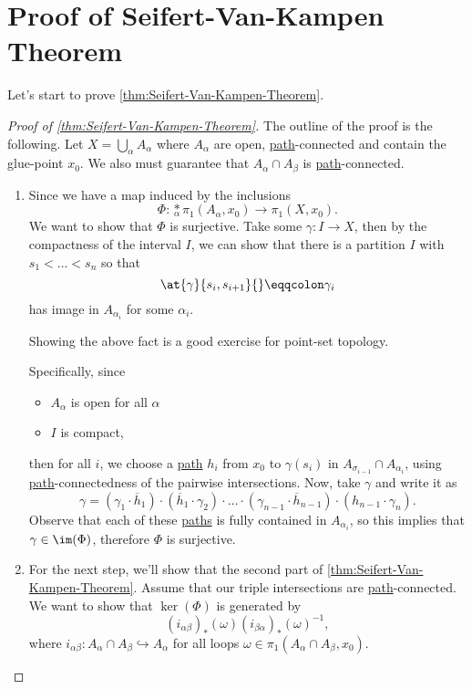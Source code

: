\section{Proof of Seifert-Van-Kampen Theorem}
Let's start to prove \autoref{thm:Seifert-Van-Kampen-Theorem}.
\begin{proof}[Proof of \autoref{thm:Seifert-Van-Kampen-Theorem}]\label{pf:thm:Seifert-Van-Kampen-Theorem}
	The outline of the proof is the following. Let \(X = \bigcup_{\alpha}A_\alpha \) where \(A_\alpha \) are open, \hyperref[def:path]{path}-connected
	and contain the glue-point \(x_0\). We also must guarantee that \(A_\alpha \cap A_\beta \) is \hyperref[def:path]{path}-connected.

	\begin{enumerate}
		\item Since we have a map induced by the inclusions
		      \[
			      \Phi \colon \underset{\alpha}{\ast} \pi _1(A_\alpha , x_0)\to \pi _1(X, x_0).
		      \]
		      We want to show that \(\Phi \) is surjective. Take some \(\gamma \colon I\to X\), then by the compactness of the interval \(I\), we can
		      show that there is a partition \(I\) with \(s_1<\ldots <s_n \) so that
		      \[
			      \at{\gamma }{s_{i}, s_{i+1}}{} \eqqcolon \gamma _{i}
		      \]
		      has image in \(A_{\alpha_{i}}\) for some \(\alpha _{i}\).

		      \begin{exercise}
			      Showing the above fact is a good exercise for point-set topology.
		      \end{exercise}

		      Specifically, since
		      \begin{itemize}
			      \item \(A_{\alpha }\) is open for all \(\alpha \)
			      \item \(I\) is compact,
		      \end{itemize}
		      then for all \(i\), we choose a \hyperref[def:path]{path} \(h_{i}\) from \(x_0\) to \(\gamma (s_{i})\) in \(A_{\sigma _{i-1}}\cap A_{\alpha _{i}}\), using
		      \hyperref[def:path]{path}-connectedness of the pairwise intersections. Now, take \(\gamma \) and write it as
		      \[
			      \gamma = (\gamma _1\cdot \overline{h} _1)\cdot (\overline{h} _1\cdot \gamma _2)\cdot \ldots \cdot (\gamma_{n-1}\cdot \overline{h} _{n-1}) \cdot (h_{n-1}\cdot \gamma _n).
		      \]
		      Observe that each of these \hyperref[def:path]{paths} is fully contained in \(A_{\alpha _{i}}\), so this implies that \(\gamma \in \im  (\Phi )\), therefore
		      \(\Phi \) is surjective.
		\item For the next step, we'll show that the second part of \autoref{thm:Seifert-Van-Kampen-Theorem}. Assume that our triple intersections are \hyperref[def:path]{path}-connected.
		      We want to show that \(\ker (\Phi ) \) is generated by
		      \[
			      (i_{\alpha \beta })_\ast (\omega )(i_{\beta \alpha })_\ast (\omega )^{-1},
		      \]
		      where \(i_{\alpha \beta }\colon A_\alpha \cap A_\beta \hookrightarrow A_\alpha\) for all loops \(\omega \in\pi_1(A_\alpha \cap A_\beta , x_0)\).


\end{enumerate}
\end{proof}
